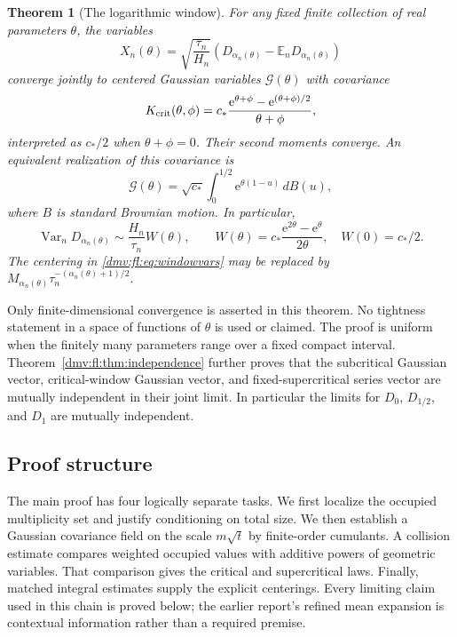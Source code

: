 \documentclass[11pt,letterpaper]{article}
\numberwithin{equation}{section}
\newtheorem{theorem}{Theorem}[section]
\theoremstyle{definition}\newtheorem{definition}[theorem]{Definition}
\theoremstyle{remark}\newtheorem{remark}[theorem]{Remark}
\newcommand{\E}{\mathbb E}
\newcommand{\ee}{\mathrm e}
\DeclareMathOperator{\Var}{Var}
\begin{document}
\begin{theorem}[The logarithmic window]\label{dmv:fl:thm:window}
For any fixed finite collection of real parameters $\theta$, the variables
\begin{equation}\label{dmv:fl:eq:windowvars}
 X_n(\theta)=\sqrt{\frac{\tau_n}{H_n}}
       \left(D_{\alpha_n(\theta)}-\E_nD_{\alpha_n(\theta)}\right)
\end{equation}
converge jointly to centered Gaussian variables $\mathcal G(\theta)$ with
covariance
\begin{equation}\label{dmv:fl:eq:windowkernel}
 K_{\rm crit}(\theta,\phi)=
 c_*\frac{\ee^{\theta+\phi}-\ee^{(\theta+\phi)/2}}{\theta+\phi},
\end{equation}
interpreted as $c_*/2$ when $\theta+\phi=0$. Their second moments converge.
An equivalent realization of this covariance is
\begin{equation}\label{dmv:fl:eq:brownian}
 \mathcal G(\theta)=\sqrt{c_*}
       \int_0^{1/2}\ee^{\theta(1-u)}\,dB(u),
\end{equation}
where $B$ is standard Brownian motion. In particular,
\begin{equation}\label{dmv:fl:eq:Wtheta}
 \Var_nD_{\alpha_n(\theta)}\sim
 \frac{H_n}{\tau_n}W(\theta),\qquad
 W(\theta)=c_*\frac{\ee^{2\theta}-\ee^\theta}{2\theta},
 \quad W(0)=c_*/2.
\end{equation}
The centering in \eqref{dmv:fl:eq:windowvars} may be replaced by
$M_{\alpha_n(\theta)}\tau_n^{-(\alpha_n(\theta)+1)/2}$.
\end{theorem}

Only finite-dimensional convergence is asserted in this theorem. No
tightness statement in a space of functions of $\theta$ is used or
claimed. The proof is uniform when the finitely many parameters range
over a fixed compact interval. Theorem~\ref{dmv:fl:thm:independence} further
proves that the subcritical Gaussian vector, critical-window Gaussian
vector, and fixed-supercritical series vector are mutually independent
in their joint limit. In particular the limits for $D_0$, $D_{1/2}$,
and $D_1$ are mutually independent.

\subsection{Proof structure}
The main proof has four logically separate tasks. We first localize the
occupied multiplicity set and justify conditioning on total size. We
then establish a Gaussian covariance field on the scale $m\sqrt t$ by
finite-order cumulants. A collision estimate compares weighted occupied
values with additive powers of geometric variables. That comparison
gives the critical and supercritical laws. Finally, matched integral
estimates supply the explicit centerings. Every limiting claim used in
this chain is proved below; the earlier report's refined mean expansion
is contextual information rather than a required premise.
\end{document}
